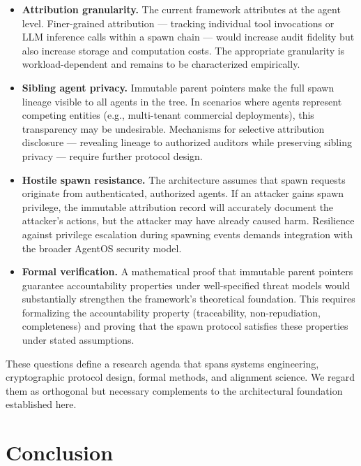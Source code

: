 \begin{itemize}
    \item \textbf{Attribution granularity.} The current framework attributes at the agent level. Finer-grained attribution — tracking individual tool invocations or LLM inference calls within a spawn chain — would increase audit fidelity but also increase storage and computation costs. The appropriate granularity is workload-dependent and remains to be characterized empirically.

    \item \textbf{Sibling agent privacy.} Immutable parent pointers make the full spawn lineage visible to all agents in the tree. In scenarios where agents represent competing entities (e.g., multi-tenant commercial deployments), this transparency may be undesirable. Mechanisms for selective attribution disclosure — revealing lineage to authorized auditors while preserving sibling privacy — require further protocol design.

    \item \textbf{Hostile spawn resistance.} The architecture assumes that spawn requests originate from authenticated, authorized agents. If an attacker gains spawn privilege, the immutable attribution record will accurately document the attacker's actions, but the attacker may have already caused harm. Resilience against privilege escalation during spawning events demands integration with the broader AgentOS security model.

    \item \textbf{Formal verification.} A mathematical proof that immutable parent pointers guarantee accountability properties under well-specified threat models would substantially strengthen the framework's theoretical foundation. This requires formalizing the accountability property (traceability, non-repudiation, completeness) and proving that the spawn protocol satisfies these properties under stated assumptions.
\end{itemize}

These questions define a research agenda that spans systems engineering, cryptographic protocol design, formal methods, and alignment science. We regard them as orthogonal but necessary complements to the architectural foundation established here.

\section{Conclusion}
\label{sec:conclusion}

